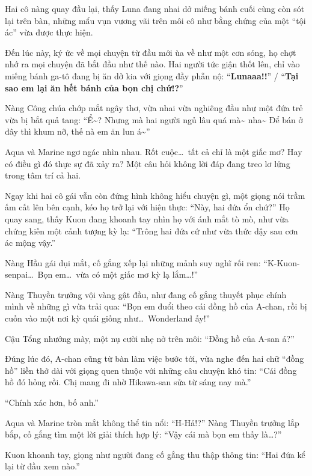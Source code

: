 \documentclass[../main.tex]{subfiles}
\begin{document}
Hai cô nàng quay đầu lại, thấy Luna đang nhai dở miếng bánh cuối cùng còn sót lại trên bàn, những mẩu vụn vương vãi trên môi cô như bằng chứng của một ``tội ác'' vừa được thực hiện.

Đến lúc này, ký ức về mọi chuyện từ đầu mới ùa về như một cơn sóng, họ chợt nhớ ra mọi chuyện đã bắt đầu như thế nào. Hai người tức giận thốt lên, chỉ vào miếng bánh ga-tô đang bị ăn dở kia với giọng đầy phẫn nộ: ``\textbf{Lunaaa!!}'' / ``\textbf{Tại sao em lại ăn hết bánh của bọn chị chứ!?}''

Nàng Công chúa chớp mắt ngây thơ, vừa nhai vừa nghiêng đầu như một đứa trẻ vừa bị bắt quả tang: ``Ể\~{}? Nhưng mà hai người ngủ lâu quá mà\~{} nha\~{} Để bán ở đây thì khum nỡ, thế nà em ăn lun á\~{}''

Aqua và Marine ngơ ngác nhìn nhau. Rốt cuộc\dots\ tất cả chỉ là một giấc mơ? Hay có điều gì đó thực sự đã xảy ra? Một câu hỏi không lời đáp đang treo lơ lửng trong tâm trí cả hai.

Ngay khi hai cô gái vẫn còn đứng hình không hiểu chuyện gì, một giọng nói trầm ấm cất lên bên cạnh, kéo họ trở lại với hiện thực: ``Này, hai đứa ổn chứ?'' Họ quay sang, thấy Kuon đang khoanh tay nhìn họ với ánh mắt tò mò, như vừa chứng kiến một cảnh tượng kỳ lạ: ``Trông hai đứa cứ như vừa thức dậy sau cơn ác mộng vậy.''

Nàng Hầu gái dụi mắt, cố gắng xếp lại những mảnh suy nghĩ rối ren: ``K-Kuon-senpai\dots\ Bọn em\dots\ vừa có một giấc mơ kỳ lạ lắm\dots!''

Nàng Thuyền trưởng vội vàng gật đầu, như đang cố gắng thuyết phục chính mình về những gì vừa trải qua: ``Bọn em đuổi theo cái đồng hồ của A-chan, rồi bị cuốn vào một nơi kỳ quái giống như\dots\ Wonderland ấy!''

Cậu Tổng nhướng mày, một nụ cười nhẹ nở trên môi: ``Đồng hồ của A-san á?''

Đúng lúc đó, A-chan cũng từ bàn làm việc bước tới, vừa nghe đến hai chữ ``đồng hồ'' liền thở dài với giọng quen thuộc với những câu chuyện khó tin: ``Cái đồng hồ đó hỏng rồi. Chị mang đi nhờ Hikawa-san sửa từ sáng nay mà.''

``Chính xác hơn, bố anh.''

Aqua và Marine tròn mắt không thể tin nổi: ``H-Hả!?'' Nàng Thuyền trưởng lắp bắp, cố gắng tìm một lời giải thích hợp lý: ``Vậy cái mà bọn em thấy là\dots?''

Kuon khoanh tay, giọng như người đang cố gắng thu thập thông tin: ``Hai đứa kể lại từ đầu xem nào.''
\end{document}
